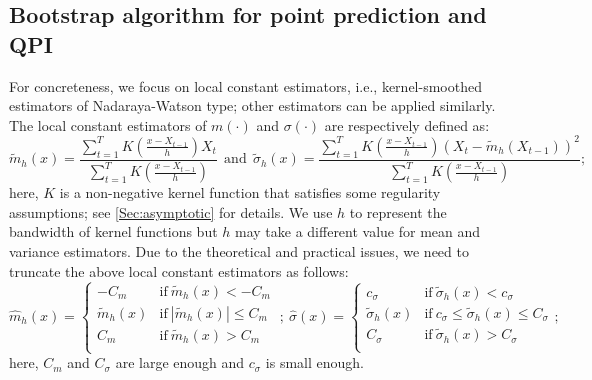 \documentclass[a4paper]{article}
\begin{document}
\subsection{Bootstrap algorithm for point prediction and QPI}
For concreteness, we focus on local constant estimators, 
i.e., kernel-smoothed estimators of Nadaraya-Watson type;
other estimators can be applied similarly. The  local constant estimators of $m(\cdot)$ and $\sigma(\cdot)$ are respectively defined as:
\begin{equation}\label{estimator}
    \widetilde{m}_h(x) =  \frac{\sum_{t=1}^{T}K(\frac{x-X_{t-1}}{h})X_{t}}{\sum_{t=1}^{T}K(\frac{x-X_{t-1}}{h})} ~~\text{and}~~ \widetilde{\sigma}_{h}(x) = \frac{\sum_{t=1}^{T}K(\frac{x-X_{t-1}}{h})(X_{t}-\widetilde{m}_h(X_{t-1}))^2}{\sum_{t=1}^{T}K(\frac{x-X_{t-1}}{h})};
\end{equation}
here, $K$ is a non-negative kernel function that 
satisfies some regularity assumptions; see \cref{Sec:asymptotic} for details. 
We use $h$ to represent the bandwidth of kernel functions but $h$ may take a different value for mean and variance estimators. Due to the theoretical and practical issues, we need to truncate the above   local constant estimators as follows:
\begin{equation}\label{truncatedest}
    \widehat{m}_{h}(x) = \begin{cases} 
    -C_{m}&\text{if}~\widetilde{m}_h(x)< -C_m\\
    \widetilde{m}_h(x)&\text{if}~|\widetilde{m}_h(x)|\leq C_m\\
    C_{m}&\text{if}~\widetilde{m}_h(x)> C_m\\
    \end{cases}~;~\widehat{\sigma}(x) = \begin{cases} 
    c_{\sigma}&\text{if}~\widetilde{\sigma}_h(x)< c_\sigma\\
\widetilde{\sigma}_h(x)&\text{if}~c_{\sigma}\leq\widetilde{\sigma}_h(x)\leq C_\sigma\\
    C_{\sigma}&\text{if}~\widetilde{\sigma}_h(x)> C_\sigma\\
    \end{cases};
    \end{equation}
here, $C_m$ and $C_\sigma$ are large enough and $c_{\sigma}$ is small enough. 
\end{document}
